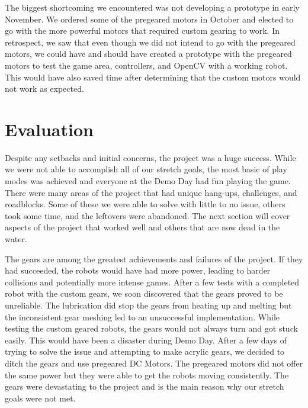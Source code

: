 \documentclass[11pt]{ieeeconf}
\begin{document}
The biggest shortcoming we encountered was not developing a prototype in early November. We ordered some of the pregeared motors in October and elected to go with the more powerful motors that required custom gearing to work. In retrospect, we saw that even though we did not intend to go with the pregeared motors, we could have and should have created a prototype with the pregeared motors to test the game area, controllers, and OpenCV with a working robot. This would have also saved time after determining that the custom motors would not work as  expected. 

\section{Evaluation}

Despite any setbacks and initial concerns, the project was a huge success. While we were not able to accomplish all of our stretch goals, the most basic of play modes was achieved and everyone at the Demo Day had fun playing the game. There were many areas of the project that had unique hang-ups, challenges, and roadblocks. Some of these we were able to solve with little to no issue, others took some time, and the leftovers were abandoned. The next section will cover aspects of the project that worked well and others that are now dead in the water.

The gears are among the greatest achievements and failures of the project. If they had succeeded, the robots would have had more power, leading to harder collisions and potentially more intense games. After a few tests with a completed robot with the custom gears, we soon discovered that the gears proved to be unreliable. The lubrication did stop the gears from heating up and melting but the inconsistent gear meshing led to an unsuccessful implementation. While testing the custom geared robots, the gears would not always turn and got stuck easily. This would have been a disaster during Demo Day. After a few days of trying to solve the issue and attempting to make acrylic gears, we decided to ditch the gears and use pregeared DC Motors. The pregeared motors did not offer the same power but they were able to get the robots moving consistently. The gears were devastating to the project and is the main reason why our stretch goals were not met.
\end{document}
